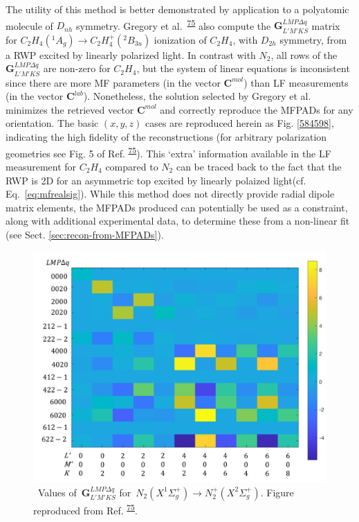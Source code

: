 \documentclass[10pt]{article}
\begin{document}
The utility of this method is better demonstrated by application to a polyatomic molecule of $D_{nh}$ symmetry. Gregory et al.~\textsuperscript{\hyperref[csl:75]{75}} also compute the $\mathbf{{G}}^{LMP\Delta q }_{L'M'KS}$ matrix for $C_2H_4(^1A_g) \rightarrow C_2H_4^+(^2B_{3u})$ ionization of $C_2H_4$, with $D_{2h}$ symmetry, from a RWP excited by linearly polarized light. In contrast with $N_2$, all rows of the $\mathbf{{G}}^{LMP\Delta q }_{L'M'KS}$ are non-zero for $C_2H_4$, but the system of linear equations is inconsistent since there are more MF parameters (in the vector $\mathbf{C}^{mol}$) than LF measurements (in the vector $\mathbf{C}^{lab}$). Nonetheless, the solution selected by Gregory et al. minimizes the retrieved vector $\mathbf{C}^{mol}$ and correctly reproduce the MFPADs for any orientation. The basic $(x,y,z)$ cases are reproduced herein as Fig. \ref{584598}, indicating the high fidelity of the reconstructions (for arbitrary polarization geometries see Fig. 5 of Ref. \textsuperscript{\hyperref[csl:75]{75}}). This `extra' information available in the LF measurement for $C_2H_4$ compared to $N_2$ can be traced back to the fact that the RWP is 2D for an asymmetric top excited by linearly polaized light(cf. Eq.~\ref{eq:mfrealsig}). While this method does not directly provide radial dipole matrix elements, the MFPADs produced can potentially be used as a constraint, along with additional experimental data, to determine these from a non-linear fit (see Sect. \ref{sec:recon-from-MFPADs}).
\begin{figure}[H]
\begin{center}
\includegraphics[width=0.70\columnwidth]{figures/GFinalplot/GFinalplot}
\caption{{~\(\)Values of~\(\mathbf{G}^{LMP\Delta q }_{L'M'KS}\) for~\(N_2(X^{1}\Sigma^{+}_{g}) \rightarrow N^+_2(X^{2}\Sigma^{+}_{g})\).
Figure reproduced from Ref.
\protect\textsuperscript{\hyperref[csl:75]{75}}.
{\label{931809}}{\label{931809}}%
}}
\end{center}
\end{figure}
\end{document}
